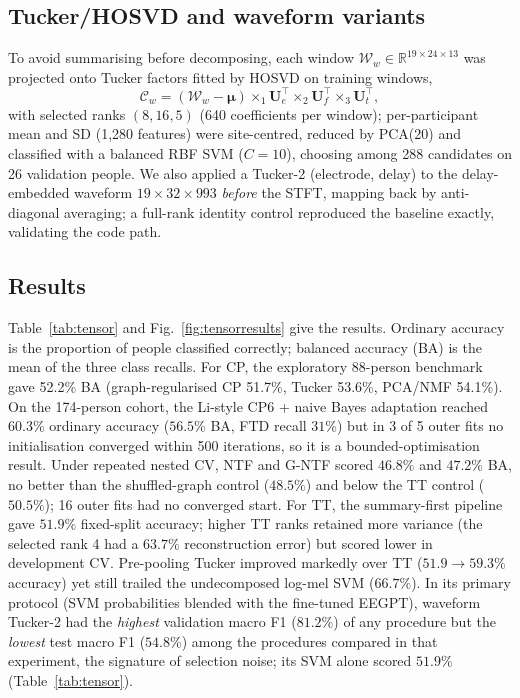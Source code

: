 \documentclass[10pt,twocolumn,a4paper]{article}
\begin{document}
\subsection{Tucker/HOSVD and waveform variants}
\label{sec:tucker}
To avoid summarising before decomposing, each window $\mathcal W_w\in\mathbb R^{19\times24\times13}$ was projected onto Tucker factors fitted by HOSVD \cite{delathauwer2000} on training windows,
\begin{equation}
\mathcal C_w=(\mathcal W_w-\bm\mu)\times_1\mathbf U_e^{\!\top}\times_2\mathbf U_f^{\!\top}\times_3\mathbf U_t^{\!\top},
\end{equation}
with selected ranks $(8,16,5)$ (640 coefficients per window); per-participant mean and SD (1,280 features) were site-centred, reduced by PCA(20) and classified with a balanced RBF SVM ($C{=}10$), choosing among 288 candidates on 26 validation people. We also applied a Tucker-2 (electrode, delay) to the delay-embedded waveform $19\times32\times993$ \emph{before} the STFT, mapping back by anti-diagonal averaging; a full-rank identity control reproduced the baseline exactly, validating the code path.

\subsection{Results}
\label{sec:tensorresults}
Table~\ref{tab:tensor} and Fig.~\ref{fig:tensorresults} give the results. Ordinary accuracy is the proportion of people classified correctly; balanced accuracy (BA) is the mean of the three class recalls. For CP, the exploratory 88-person benchmark gave 52.2\% BA (graph-regularised CP 51.7\%, Tucker 53.6\%, PCA/NMF 54.1\%). On the 174-person cohort, the Li-style CP6 + naive Bayes adaptation reached $60.3\%$ ordinary accuracy ($56.5\%$ BA, FTD recall $31\%$) but in 3 of 5 outer fits no initialisation converged within 500 iterations, so it is a bounded-optimisation result. Under repeated nested CV, NTF and G-NTF scored $46.8\%$ and $47.2\%$ BA, no better than the shuffled-graph control ($48.5\%$) and below the TT control ($50.5\%$); 16 outer fits had no converged start. For TT, the summary-first pipeline gave $51.9\%$ fixed-split accuracy; higher TT ranks retained more variance (the selected rank 4 had a $63.7\%$ reconstruction error) but scored lower in development CV. Pre-pooling Tucker improved markedly over TT ($51.9\to59.3\%$ accuracy) yet still trailed the undecomposed log-mel SVM ($66.7\%$). In its primary protocol (SVM probabilities blended with the fine-tuned EEGPT), waveform Tucker-2 had the \emph{highest} validation macro F1 ($81.2\%$) of any procedure but the \emph{lowest} test macro F1 ($54.8\%$) among the procedures compared in that experiment, the signature of selection noise; its SVM alone scored $51.9\%$ (Table~\ref{tab:tensor}).
\end{document}
